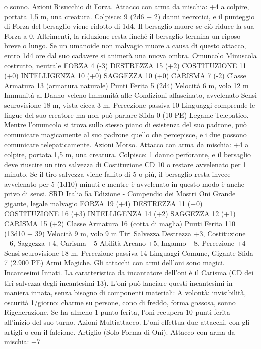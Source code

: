 \begin{multicols}{2}
o sonno.
Azioni
Risucchio di Forza. Attacco con arma da mischia: +4 a colpire,
portata 1,5 m, una creatura.
Colpisce: 9 (2d6 + 2) danni necrotici, e il punteggio di Forza del
bersaglio viene ridotto di 1d4. Il bersaglio muore se ciò riduce la
sua Forza a 0. Altrimenti, la riduzione resta finché il bersaglio
termina un riposo breve o lungo.
Se un umanoide non malvagio muore a causa di questo attacco,
entro 1d4 ore dal suo cadavere si animerà una nuova ombra.
Omuncolo
Minuscola costrutto, neutrale
FORZA 4 (-3)
DESTREZZA 15 (+2)
COSTITUZIONE 11 (+0)
INTELLIGENZA 10 (+0)
SAGGEZZA 10 (+0)
CARISMA 7 (-2)
Classe Armatura 13 (armatura naturale)
Punti Ferita 5 (2d4)
Velocità 6 m, volo 12 m
Immunità al Danno veleno
Immunità alle Condizioni affascinato, avvelenato
Sensi scurovisione 18 m, vista cieca 3 m, Percezione passiva 10
Linguaggi comprende le lingue del suo creatore ma non può
parlare
Sfida 0 (10 PE)
Legame Telepatico. Mentre l’omuncolo si trova sullo stesso piano
di esistenza del suo padrone, può comunicare magicamente al suo
padrone quello che percepisce, e i due possono comunicare
telepaticamente.
Azioni
Morso. Attacco con arma da mischia: +4 a colpire, portata 1,5
m, una creatura.
Colpisce: 1 danno perforante, e il bersaglio deve riuscire un tiro
salvezza di Costituzione CD 10 o restare avvelenato per 1
minuto. Se il tiro salvezza viene fallito di 5 o più, il bersaglio
resta invece avvelenato per 5 (1d10) minuti e mentre è
avvelenato in questo modo è anche privo di sensi.
SRD Italia 5a Edizione - Compendio dei Mostri
Oni
Grande gigante, legale malvagio
FORZA 19 (+4)
DESTREZZA 11 (+0)
COSTITUZIONE 16 (+3)
INTELLIGENZA 14 (+2)
SAGGEZZA 12 (+1)
CARISMA 15 (+2)
Classe Armatura 16 (cotta di maglia)
Punti Ferita 110 (13d10 + 39)
Velocità 9 m, volo 9 m
Tiri Salvezza Destrezza +3, Costituzione +6, Saggezza +4,
Carisma +5
Abilità Arcano +5, Inganno +8, Percezione +4
Sensi scurovisione 18 m, Percezione passiva 14
Linguaggi Comune, Gigante
Sfida 7 (2.900 PE)
Armi Magiche. Gli attacchi con armi dell’oni sono magici.
Incantesimi Innati. La caratteristica da incantatore dell’oni è il
Carisma (CD dei tiri salvezza degli incantesimi 13). L’oni può
lanciare questi incantesimi in maniera innata, senza bisogno di
componenti materiali:
A volontà: invisibilità, oscurità
1/giorno: charme su persone, cono di freddo, forma gassosa,
sonno
Rigenerazione. Se ha almeno 1 punto ferita, l’oni recupera 10
punti ferita all’inizio del suo turno.
Azioni
Multiattacco. L’oni effettua due attacchi, con gli artigli o con il
falcione.
Artiglio (Solo Forma di Oni). Attacco con arma da mischia: +7

\end{multicols}
